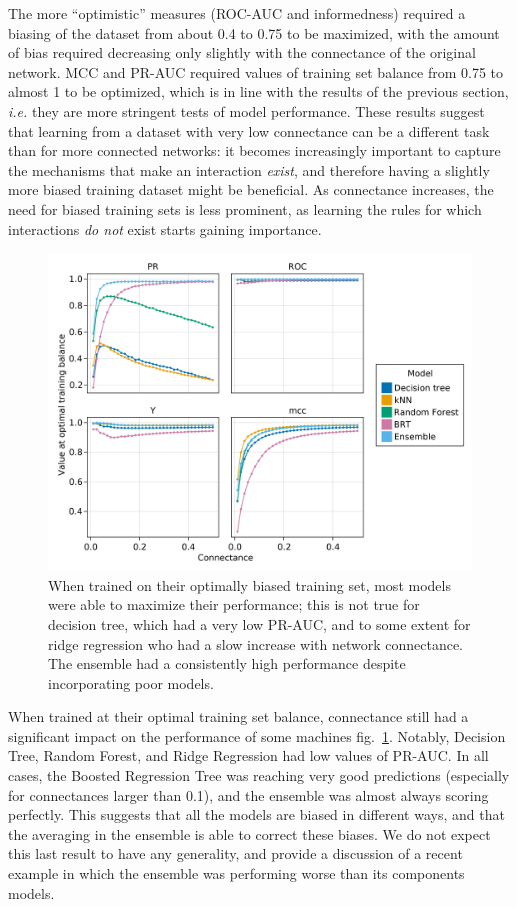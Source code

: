 \documentclass[11pt]{article}
\makeatletter
\def\maxwidth{\ifdim\Gin@nat@width>\linewidth\linewidth
\else\Gin@nat@width\fi}
\let\Oldincludegraphics\includegraphics
\renewcommand{\includegraphics}[1]{\Oldincludegraphics[width=\maxwidth]{#1}}
\makeatother
\begin{document}
The more ``optimistic'' measures (ROC-AUC and informedness) required a
biasing of the dataset from about 0.4 to 0.75 to be maximized, with the
amount of bias required decreasing only slightly with the connectance of
the original network. MCC and PR-AUC required values of training set
balance from 0.75 to almost 1 to be optimized, which is in line with the
results of the previous section, \emph{i.e.} they are more stringent
tests of model performance. These results suggest that learning from a
dataset with very low connectance can be a different task than for more
connected networks: it becomes increasingly important to capture the
mechanisms that make an interaction \emph{exist}, and therefore having a
slightly more biased training dataset might be beneficial. As
connectance increases, the need for biased training sets is less
prominent, as learning the rules for which interactions \emph{do not}
exist starts gaining importance.

\begin{figure}
\hypertarget{fig:optimvalue}{%
\centering
\includegraphics{figures/optimal_value.png}
\caption{When trained on their optimally biased training set, most
models were able to maximize their performance; this is not true for
decision tree, which had a very low PR-AUC, and to some extent for ridge
regression who had a slow increase with network connectance. The
ensemble had a consistently high performance despite incorporating poor
models.}\label{fig:optimvalue}
}
\end{figure}

When trained at their optimal training set balance, connectance still
had a significant impact on the performance of some machines
fig.~\ref{fig:optimvalue}. Notably, Decision Tree, Random Forest, and
Ridge Regression had low values of PR-AUC. In all cases, the Boosted
Regression Tree was reaching very good predictions (especially for
connectances larger than 0.1), and the ensemble was almost always
scoring perfectly. This suggests that all the models are biased in
different ways, and that the averaging in the ensemble is able to
correct these biases. We do not expect this last result to have any
generality, and provide a discussion of a recent example in which the
ensemble was performing worse than its components models.
\end{document}
